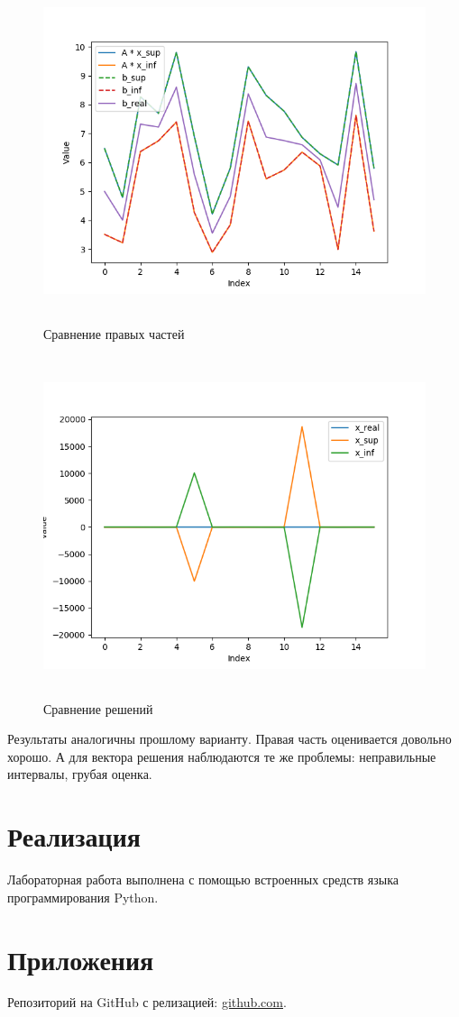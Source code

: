 \documentclass[12pt,a4paper]{scrartcl}
\begin{document}
\begin{figure}[H]
    \centering
    \includegraphics[width=14cm, height=10cm]{fig/b_comp_2.png}
	\caption{Сравнение правых частей}
\end{figure}

\begin{figure}[H]
    \centering
    \includegraphics[width=14cm, height=10cm]{fig/x_comp_2.png}
	\caption{Сравнение решений}
\end{figure}

Результаты аналогичны прошлому варианту. Правая часть оценивается довольно хорошо. А для вектора решения наблюдаются те же проблемы: неправильные интервалы, грубая оценка.

\section {Реализация}
Лабораторная работа выполнена с помощью встроенных средств языка программирования Python.

\section{Приложения}
Репозиторий на GitHub с релизацией: \href{https://github.com/WiillyWonka/Intervals}{github.com}.
\end{document}
